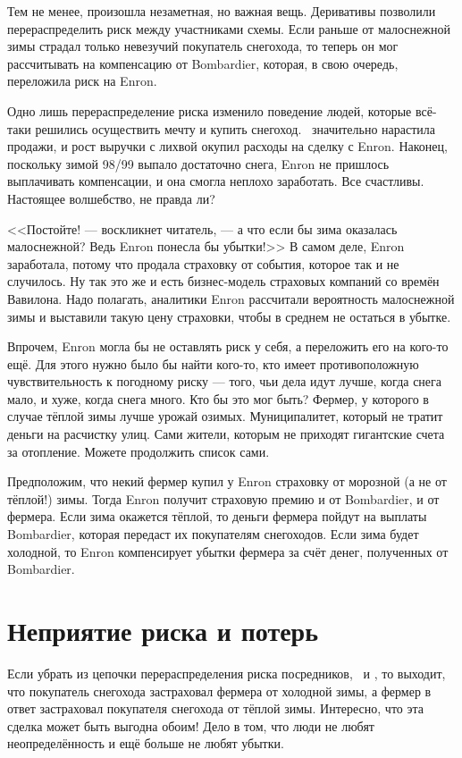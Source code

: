Тем не менее, произошла незаметная, но важная вещь. Деривативы позволили перераспределить
риск между участниками схемы. Если раньше от малоснежной зимы страдал только невезучий
покупатель снегохода, то теперь он мог рассчитывать на компенсацию от Bombardier, которая, в
свою очередь, переложила риск на Enron.

Одно лишь перераспределение риска изменило поведение людей, которые всё-таки
решились осуществить мечту и купить снегоход. \ значительно нарастила продажи, и рост
выручки с лихвой окупил расходы на сделку с Enron. Наконец, поскольку зимой 98/99 выпало
достаточно снега, Enron не пришлось выплачивать компенсации, и она смогла
неплохо заработать. Все счастливы. Настоящее волшебство, не правда ли?

<<Постойте! --- воскликнет читатель, --- а что если бы зима оказалась малоснежной? Ведь Enron
понесла бы убытки!>> В самом деле, Enron заработала, потому что продала страховку от
события, которое так и не случилось. Ну так это же и есть бизнес-модель страховых компаний со
времён Вавилона. Надо полагать, аналитики Enron рассчитали вероятность малоснежной зимы
и выставили такую цену страховки, чтобы в среднем не остаться в убытке.

Впрочем, Enron могла бы не оставлять риск у себя, а переложить его на кого-то
ещё. Для этого нужно было бы найти кого-то, кто имеет противоположную
чувствительность к погодному риску --- того, чьи дела идут лучше, когда снега мало,
и хуже, когда снега много. Кто бы это мог быть? Фермер, у которого в случае тёплой
зимы лучше урожай озимых. Муниципалитет, который не тратит деньги на расчистку
улиц. Сами жители, которым не приходят гигантские счета за отопление. Можете
продолжить список сами.

Предположим, что некий фермер купил у Enron страховку от морозной (а не от тёплой!)
зимы. Тогда Enron получит страховую премию и от Bombardier, и от фермера. Если зима
окажется тёплой, то деньги фермера пойдут на выплаты Bombardier, которая передаст их
покупателям снегоходов. Если зима будет холодной, то Enron компенсирует убытки фермера
за счёт денег, полученных от Bombardier.

\section*{Неприятие риска и потерь}

Если убрать из цепочки перераспределения риска
посредников, \ 
и , то выходит, что покупатель снегохода застраховал фермера
от холодной зимы, а фермер в ответ застраховал покупателя снегохода от тёплой зимы. Интересно, что эта сделка может быть выгодна обоим! Дело в том, что люди не любят неопределённость и ещё больше не любят убытки.

